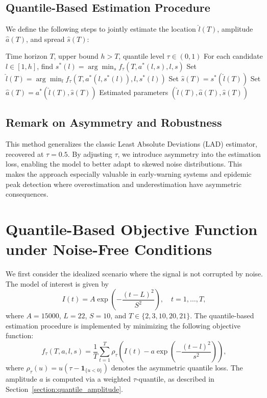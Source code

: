 \documentclass[12pt,a4paper]{article}
\begin{document}
	
	\subsection{Quantile-Based Estimation Procedure}
	
	We define the following steps to jointly estimate the location \( \hat{l}(T) \), amplitude \( \hat{a}(T) \), and spread \( \hat{s}(T) \):
	
	\begin{algorithm}[htbp]
		\caption{Quantile-based estimation of peak parameters}
		\label{algo:quantile}
		\begin{algorithmic}[1]
			\REQUIRE Time horizon \( T \), upper bound \( h > T \), quantile level \( \tau \in (0,1) \)
			\STATE For each candidate \( l \in [1, h] \), find \( s^*(l) = \arg\min_s f_\tau(T, a^*(l,s), l, s) \)
			\STATE Set \( \hat{l}(T) = \arg\min_l f_\tau(T, a^*(l,s^*(l)), l, s^*(l)) \)
			\STATE Set \( \hat{s}(T) = s^*(\hat{l}(T)) \)
			\STATE Set \( \hat{a}(T) = a^*(\hat{l}(T), \hat{s}(T)) \)
			\ENSURE Estimated parameters \( (\hat{l}(T), \hat{a}(T), \hat{s}(T)) \)
		\end{algorithmic}
	\end{algorithm}
	
	\subsection{Remark on Asymmetry and Robustness}
	
	This method generalizes the classic Least Absolute Deviations (LAD) estimator, recovered at \( \tau = 0.5 \). By adjusting \( \tau \), we introduce asymmetry into the estimation loss, enabling the model to better adapt to skewed noise distributions. This makes the approach especially valuable in early-warning systems and epidemic peak detection where overestimation and underestimation have asymmetric consequences.
	
	
	\section{Quantile-Based Objective Function under Noise-Free Conditions}
	
	We first consider the idealized scenario where the signal is not corrupted by noise. The model of interest is given by
	\[
	I(t) = A \exp\left( -\frac{(t - L)^2}{S^2} \right), \quad t = 1, \dots, T,
	\]
	where \( A = 15000 \), \( L = 22 \), \( S = 10 \), and \( T \in \{2, 3, 10, 20, 21\} \). The quantile-based estimation procedure is implemented by minimizing the following objective function:
	\[
	f_\tau(T, a, l, s) = \frac{1}{T} \sum_{t=1}^T \rho_\tau\left( I(t) - a \exp\left( -\frac{(t - l)^2}{s^2} \right) \right),
	\]
	where \( \rho_\tau(u) = u(\tau - \mathbf{1}_{\{u < 0\}}) \) denotes the asymmetric quantile loss. The amplitude \( a \) is computed via a weighted \( \tau \)-quantile, as described in Section~\ref{section:quantile_amplitude}.
	
\end{document}
